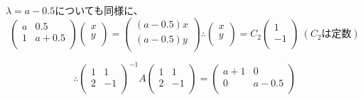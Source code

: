 \documentclass[]{jsarticle}
\begin{document}
        $\lambda = a - 0.5$についても同様に、
        \begin{equation*}
            \begin{pmatrix}
                a & 0.5 \\
                1 & a + 0.5 \\
            \end{pmatrix}
            \begin{pmatrix}
                x \\
                y \\
            \end{pmatrix} =
            \begin{pmatrix}
                (a - 0.5)x \\
                (a - 0.5)y \\
            \end{pmatrix}
            \therefore
            \begin{pmatrix}
                x \\
                y \\
            \end{pmatrix} =
            C_2\begin{pmatrix}
                1 \\
                -1 \\
            \end{pmatrix} \
            (C_2は定数)
        \end{equation*}

        \begin{equation*}
            \therefore\begin{pmatrix}
                1 & 1 \\
                2 & -1 \\
            \end{pmatrix}^{-1}A\begin{pmatrix}
                1 & 1 \\
                2 & -1 \\
            \end{pmatrix} = \begin{pmatrix}
                a + 1 & 0 \\
                0 & a - 0.5 \\
            \end{pmatrix}
        \end{equation*}
\end{document}
